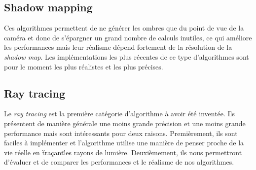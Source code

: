 \documentclass[a4paper,10pt]{report}
\begin{document}
\subsection{Shadow mapping}

Ces algorithmes permettent de ne générer les ombres que du point de vue de la caméra et donc de s'épargner un grand nombre de calculs inutiles, ce qui améliore les performances mais leur réalisme dépend fortement de la résolution de la \textit{shadow map}. Les implémentations les plus récentes de ce type d'algorithmes sont pour le moment les plus réalistes et les plus précises.

\subsection{Ray tracing}

Le \textit{ray tracing} est la première catégorie d'algorithme à avoir été inventée. Ils présentent de manière générale une moins grande précision et une moins grande performance mais sont intéressants pour deux raisons.
Premièrement, ils sont faciles à implémenter et l'algorithme utilise une manière de penser proche de la vie réelle en \"traçant\" les rayons de lumière.
Deuxièmement, ils nous permettront d'évaluer et de comparer les performances et le réalisme de nos algorithmes.




\end{document}
